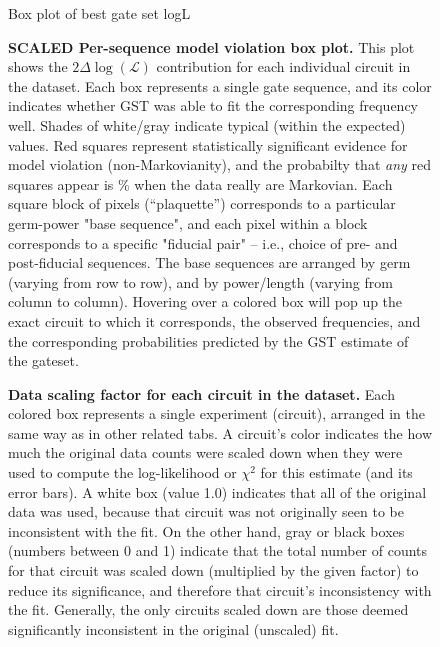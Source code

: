 \documentclass{article}[11pt]
\newcommand{\putfield}[2]{#2}
\begin{document}
{{{\begin{figure}
  \begin{center}
    \begin{adjustbox}{max width=\textwidth}
      \putfield{bestEstimateColorBoxPlot_scl}{Box plot of best gate set logL}
    \end{adjustbox}
    \caption{\textbf{SCALED Per-sequence model violation box plot.}  This plot shows the $2\Delta\log(\mathcal{L})$ contribution for each individual circuit in the dataset.  Each box represents a single gate sequence, and its color indicates whether GST was able to fit the corresponding frequency well.  Shades of white/gray indicate typical (within the expected) values. Red squares represent statistically significant evidence for model violation (non-Markovianity), and the probabilty that \emph{any} red squares appear is \putfield{linlg_pcntle}{}\% when the data really are Markovian. Each square block of pixels (``plaquette'') corresponds to a particular germ-power "base sequence", and each pixel within a block corresponds to a specific "fiducial pair" -- i.e., choice of pre- and post-fiducial sequences.  The base sequences are arranged by germ (varying from row to row), and by power/length (varying from column to column).  Hovering over a colored box will pop up the exact circuit to which it corresponds, the observed frequencies, and the corresponding probabilities predicted by the GST estimate of the gateset.\label{bestEstimateColorBoxPlot}}
\end{center}
\end{figure}

}{}

\begin{figure}
  \begin{center}
    \putfield{dataScalingColorBoxPlot}{}
    \caption{\textbf{Data scaling factor for each circuit in the dataset.}  Each colored box represents a single experiment (circuit), arranged in the same way as in other related tabs.  A circuit's color indicates the how much the original data counts were scaled down when they were used to compute the log-likelihood or $\chi^2$ for this estimate (and its error bars).  A white box (value 1.0) indicates that all of the original data was used, because that circuit was not originally seen to be inconsistent with the fit. On the other hand, gray or black boxes (numbers between 0 and 1) indicate that the total number of counts for that circuit was scaled down (multiplied by the given factor) to reduce its significance, and therefore that circuit's inconsistency with the fit.  Generally, the only circuits scaled down are those deemed significantly inconsistent in the original (unscaled) fit.
    }
  \end{center}
\end{figure}

}}
\end{document}
